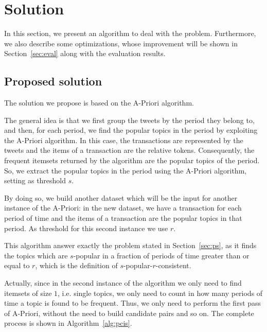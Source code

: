 \section{Solution} 
\label{sec:sol}
In this section, we present an algorithm to deal with the problem. 
Furthermore, we also describe some optimizations, whose improvement will be 
shown in Section~\ref{sec:eval} along with the evaluation results.

\subsection{Proposed solution}
The solution we propose is based on the A-Priori algorithm. 

The general idea is that we first group the tweets by the period they belong to, 
and then, for each period, we find the popular topics in the period by
exploiting the A-Priori algorithm. In this case, the transactions are represented by 
the tweets and the items of a transaction are the relative tokens. Consequently, 
the frequent itemsets returned by the algorithm are the popular topics of the period.
So, we extract the popular topics in the period using the A-Priori algorithm, 
setting as threshold $s$. 

By doing so, we build another dataset which will be the input for another 
instance of the A-Priori: in 
the new dataset, we have a transaction for each period of time and the items of a transaction
are the popular topics in that period. As threshold for this second instance we use $r$.

This algorithm answer exactly the problem stated in Section~\ref{sec:ps}, as 
it finds the topics which are $s$-popular in a fraction of periods of time greater than or equal to $r$,
which is the definition of $s$-popular-$r$-consistent. 

Actually, since in the second instance of the algorithm we only need to find 
itemsets of size $1$, i.e. single topics,
we only need to count in how many periods of time a topic is found to be frequent.
Thus, we only need to perform the first pass of A-Priori, without the need to build 
candidate pairs and so on. The complete process is shown in Algorithm~\ref{alg:pcis}. 




